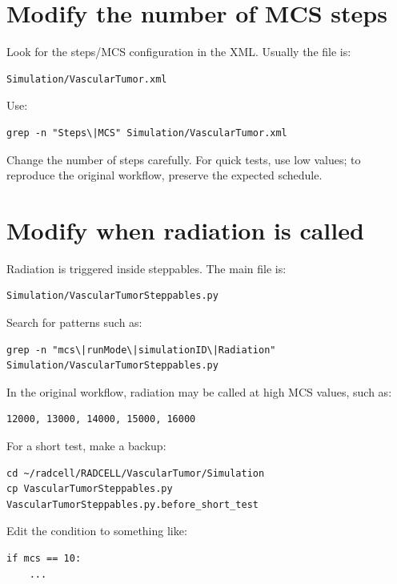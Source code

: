 \documentclass[11pt,a4paper,twoside,pdftex]{refrep}
\begin{document}
\section{Modify the number of MCS steps}

Look for the steps/MCS configuration in the XML. Usually the file is:

\begin{lstlisting}
Simulation/VascularTumor.xml
\end{lstlisting}

Use:

\begin{lstlisting}
grep -n "Steps\|MCS" Simulation/VascularTumor.xml
\end{lstlisting}

Change the number of steps carefully. For quick tests, use low values; to reproduce the original workflow, preserve the expected schedule.

\section{Modify when radiation is called}

Radiation is triggered inside steppables. The main file is:

\begin{lstlisting}
Simulation/VascularTumorSteppables.py
\end{lstlisting}

Search for patterns such as:

\begin{lstlisting}
grep -n "mcs\|runMode\|simulationID\|Radiation" Simulation/VascularTumorSteppables.py
\end{lstlisting}

In the original workflow, radiation may be called at high MCS values, such as:

\begin{lstlisting}
12000, 13000, 14000, 15000, 16000
\end{lstlisting}

For a short test, make a backup:

\begin{lstlisting}
cd ~/radcell/RADCELL/VascularTumor/Simulation
cp VascularTumorSteppables.py VascularTumorSteppables.py.before_short_test
\end{lstlisting}

Edit the condition to something like:

\begin{lstlisting}
if mcs == 10:
    ...
\end{lstlisting}
\end{document}
